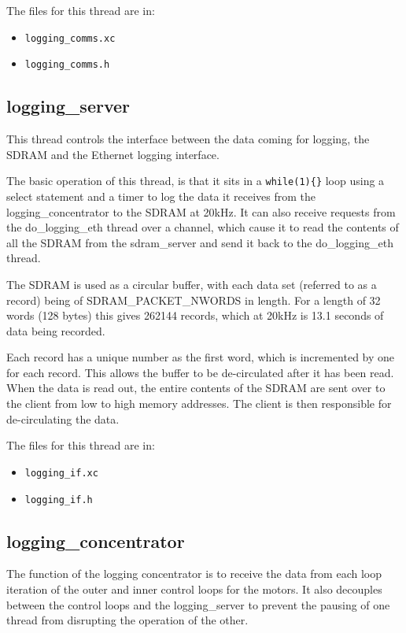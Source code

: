 The files for this thread are in:

\begin{itemize}
\item \verb!logging_comms.xc!
\item \verb!logging_comms.h!
\end{itemize}


\subsection{logging\_server}

This thread controls the interface between the data coming for logging, the SDRAM and the Ethernet logging interface.

The basic operation of this thread, is that it sits in a \verb!while(1){}! loop using a select statement and a timer to log the data it receives from the logging\_concentrator to the SDRAM at 20kHz.
It can also receive requests from the do\_logging\_eth thread over a channel, which cause it to read the contents of all the SDRAM from the sdram\_server and send it back to the do\_logging\_eth thread.

The SDRAM is used as a circular buffer, with each data set (referred to as a record) being of SDRAM\_PACKET\_NWORDS in length.
For a length of 32 words (128 bytes) this gives 262144 records, which at 20kHz is 13.1 seconds of data being recorded.

Each record has a unique number as the first word, which is incremented by one for each record.
This allows the buffer to be de-circulated after it has been read.
When the data is read out, the entire contents of the SDRAM are sent over to the client from low to high memory addresses.
The client is then responsible for de-circulating the data.

The files for this thread are in:

\begin{itemize}
\item \verb!logging_if.xc!
\item \verb!logging_if.h!
\end{itemize}


\subsection{logging\_concentrator}

The function of the logging concentrator is to receive the data from each loop iteration of the outer and inner control loops for the motors.
It also decouples between the control loops and the logging\_server to prevent the pausing of one thread from disrupting the operation of the other.


